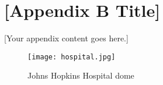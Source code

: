 \chapter{[Appendix B Title]}
\label{app:appendix2}

[Your appendix content goes here.]

\begin{figure}[ht]
    \centering
    \texttt{[image: hospital.jpg]}
    \caption{Johns Hopkins Hospital dome}
    \label{fig:hospital}
\end{figure}